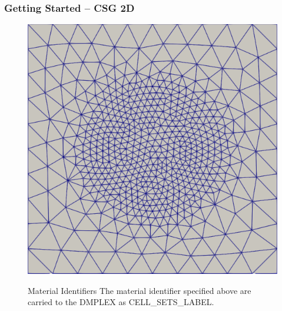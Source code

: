 \documentclass{beamer}
\begin{document}
	\begin{frame}
		\frametitle{Getting Started -- CSG 2D}
		\begin{figure}
			\centering
			\includegraphics[scale=0.18]{Figures/CSG2DMesh}
			\begin{alertblock}{Material Identifiers}
				The material identifier specified above are carried to the DMPLEX as CELL\_SETS\_LABEL.
			\end{alertblock}
		\end{figure}
	\end{frame}
\end{document}
